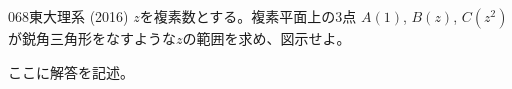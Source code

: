 \begin{thm}{068}{}{東大理系 (2016)}
 $z$を複素数とする。複素平面上の3点 $A(1)$, $B(z)$, $C(z^2)$ が鋭角三角形をなすような$z$の範囲を求め、図示せよ。
\end{thm}

ここに解答を記述。